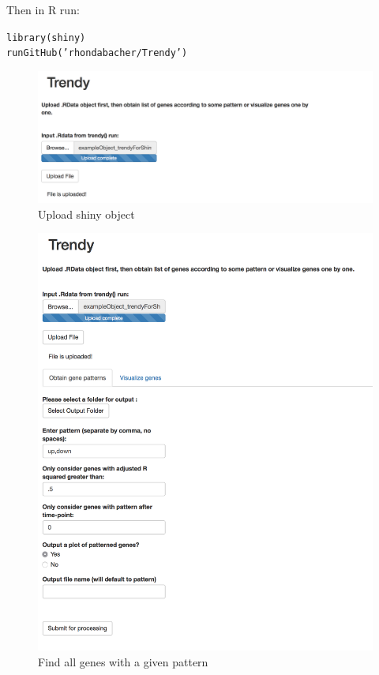 \documentclass{article}\usepackage[]{graphicx}\usepackage[usenames,dvipsnames]{color}
\newcommand{\hlstr}[1]{\textcolor[rgb]{0.251,0.627,0.251}{#1}}%
\newcommand{\hlstd}[1]{\textcolor[rgb]{0.251,0.251,0.251}{#1}}%
\newcommand{\hlkwd}[1]{\textcolor[rgb]{0.878,0.439,0.125}{#1}}%
\newenvironment{knitrout}{}{} %
\begin{document}
Then in R run:
\begin{knitrout}
\color{fgcolor}\begin{kframe}
\begin{alltt}
\hlkwd{library}\hlstd{(shiny)}
\hlkwd{runGitHub}\hlstd{(}\hlstr{'rhondabacher/Trendy'}\hlstd{)}
\end{alltt}
\end{kframe}
\end{knitrout}

\begin{figure}[H]
\centering
\includegraphics[width=1\textwidth]{Shiny_UploadData.png}
\caption{Upload shiny object}
\end{figure}


\begin{figure}[H]
\centering
\includegraphics[width=1\textwidth]{Shing_allGenePat.png}
\caption{Find all genes with a given pattern}
\end{figure}
\end{document}
